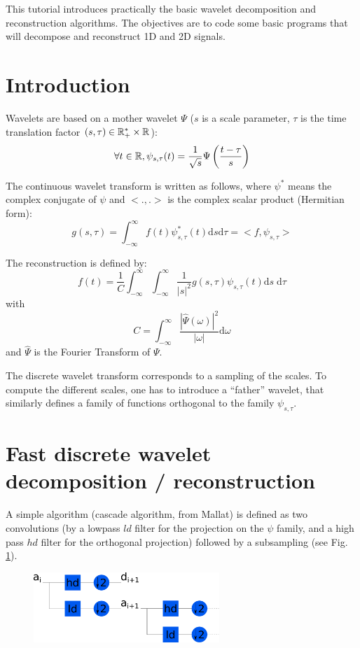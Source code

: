 \def\difficulty{2}

\begin{note}This tutorial introduces practically the basic wavelet decomposition and reconstruction algorithms. The objectives are to code some basic programs that will decompose and reconstruct 1D and 2D signals.\end{note}

\section{Introduction}
Wavelets are based on a mother wavelet $\Psi$ ($s$ is a scale parameter, $\tau$ is the time translation factor $(s,\tau)\in \mathbb{R}^*_+ \times 
\mathbb{R}$):
$$\forall t \in \mathbb{R}, \psi_{s,\tau}(t) = \frac{1}{\sqrt{s}}\Psi\left( \frac{t-\tau}{s}\right) $$

The continuous wavelet transform is written as follows, where $\psi^*$ means the complex conjugate of $\psi$ and $<.,.>$ is the complex scalar 
product (Hermitian form):
$$g(s,\tau)=\int_{-\infty}^\infty f(t)\psi^*_{s,\tau}(t)\textrm{d}s\textrm{d}\tau =<f,\psi_{s,\tau}>$$

The reconstruction is defined by:
$$f(t) = \frac{1}{C} \int_{-\infty}^{\infty} \int_{-\infty}^{\infty} \frac{1}{|s|^2} g(s,\tau) \psi_{s,\tau}(t) \textrm{d} s \; 
\textrm{d}\tau$$
with $$C= \int_{-\infty}^{\infty} \frac{|\hat{\Psi}(\omega)|^2}{|\omega|} \textrm{d}\omega $$
and $\hat{\Psi}$ is the Fourier Transform of $\Psi$.

The discrete wavelet transform corresponds to a sampling of the scales. To compute the different scales, one has to introduce a ``father'' 
wavelet, that similarly defines a family of functions orthogonal to the family $\psi_{s,\tau}$.

\section{Fast discrete wavelet decomposition / reconstruction}
A simple algorithm (cascade algorithm, from Mallat) is defined as two convolutions (by a lowpass $ld$ filter for the projection on the 
$\psi$ family, and a high pass $hd$ filter for the orthogonal projection) followed by a subsampling (see Fig. 
\ref{fig:wavelets:decomposition}).

\begin{figure}[H]
 \centering
\includegraphics[width=7cm]{schema_decomposition}
\caption{}
\label{fig:wavelets:decomposition}
\end{figure}

